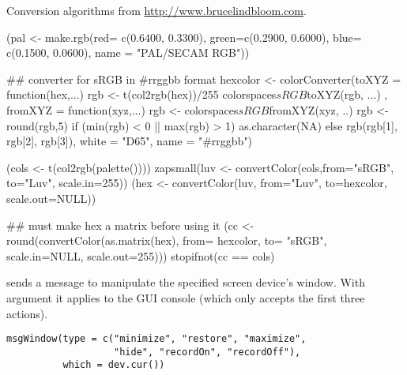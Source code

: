 %
\begin{References}\relax
Conversion algorithms from \url{http://www.brucelindbloom.com}.
\end{References}
%
\begin{SeeAlso}\relax
{}
\end{SeeAlso}
%
\begin{Examples}
\begin{ExampleCode}
(pal <- make.rgb(red=  c(0.6400, 0.3300),
                 green=c(0.2900, 0.6000),
                 blue= c(0.1500, 0.0600),
                 name = "PAL/SECAM RGB"))

## converter for sRGB in #rrggbb format
hexcolor <- colorConverter(toXYZ = function(hex,...) {
                            rgb <- t(col2rgb(hex))/255
                            colorspaces$sRGB$toXYZ(rgb, ...) },
                           fromXYZ = function(xyz,...) {
                              rgb <- colorspaces$sRGB$fromXYZ(xyz, ..)
                              rgb <- round(rgb,5)
                              if (min(rgb) < 0 || max(rgb) > 1)
                                   as.character(NA)
                              else rgb(rgb[1], rgb[2], rgb[3])},
                           white = "D65", name = "#rrggbb")

(cols <- t(col2rgb(palette())))
zapsmall(luv <- convertColor(cols,from="sRGB", to="Luv", scale.in=255))
(hex <- convertColor(luv, from="Luv",  to=hexcolor, scale.out=NULL))

## must make hex a matrix before using it
(cc <- round(convertColor(as.matrix(hex), from= hexcolor, to= "sRGB",
                          scale.in=NULL, scale.out=255)))
stopifnot(cc == cols)
\end{ExampleCode}
\end{Examples}
%
\begin{Description}\relax
{} sends a message to manipulate the specified screen
device's window.  With argument  it applies to the GUI
console (which only accepts the first three actions).
\end{Description}
%
\begin{Usage}
\begin{verbatim}
msgWindow(type = c("minimize", "restore", "maximize",
                   "hide", "recordOn", "recordOff"),
          which = dev.cur())
\end{verbatim}
\end{Usage}
